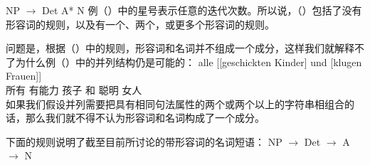 \ea 
NP $\to$ Det A* N
\z
例（）中的星号\isc{*}\is{*}表示任意的迭代次数。所以说，（）包括了没有形容词的规则，以及有一个、两个，或更多个形容词的规则。

问题是，根据（）中的规则，形容词和名词并不组成一个成分，这样我们就解释不了为什么例（）中的并列结构仍是可能的：
\ea
\gll alle [[geschickten Kinder] und [klugen Frauen]]\\
	 所有  \spacebr{}\spacebr{}有能力 孩子 和  \spacebr{}聪明 女人\\
\z
如果我们假设并列需要把具有相同句法属性的两个或两个以上的字符串相组合的话，那么我们就不得不认为形容词和名词构成了一个成分。

%
下面的规则说明了截至目前所讨论的带形容词的名词短语：
\eal
\label{NP-Regeln}
\ex NP $\to$ Det \nbar
\ex\label{NP-Regeln-Adj} \nbar $\to$ A \nbar
\ex\label{NP-Regeln-Nbar-N} \nbar $\to$ N
\zl

